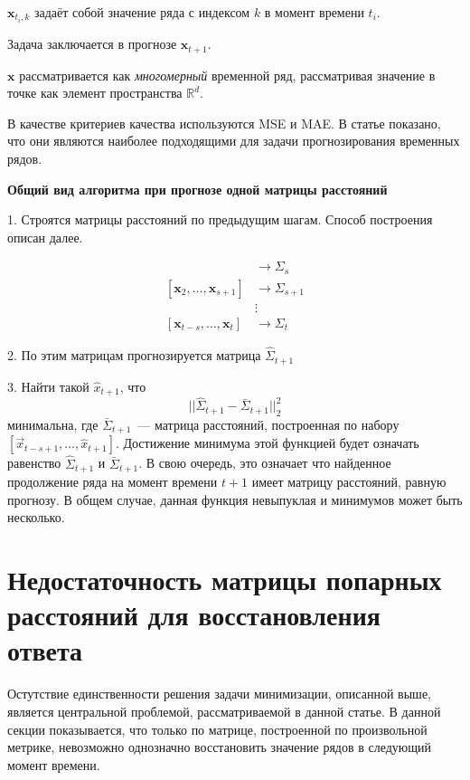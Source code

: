 \documentclass{article}
\begin{document}
$\mathbf{x}_{t_i, k}$ задаёт собой значение ряда с индексом $k$ в момент времени $t_i$.

Задача заключается в прогнозе $\mathbf{x}_{t+1}$.

$\mathbf{x}$ рассматривается как \textit{многомерный} временной ряд, рассматривая значение в точке как элемент пространства $\mathbb{R}^d$.

В качестве критериев качества используются MSE и MAE. В статье \cite{jadon2022comprehensive} показано, что они являются наиболее подходящими для задачи прогнозирования временных рядов.

\textbf{Общий вид алгоритма при прогнозе одной матрицы расстояний}

1. Строятся матрицы расстояний по предыдущим шагам. Способ построения описан далее.

\begin{align*}
	[\mathbf{x}_1, \ldots, \mathbf{x}_s] &\rightarrow \Sigma_s \\
	[\mathbf{x}_2, \ldots, \mathbf{x}_{s+1}] &\rightarrow \Sigma_{s+1} \\
	&\vdots \\
	[\mathbf{x}_{t-s}, \ldots, \mathbf{x}_t] &\rightarrow \Sigma_{t}
\end{align*}

2. По этим матрицам прогнозируется матрица $\hat{\Sigma}_{t+1}$

3. Найти такой $\hat{x}_{t+1}$, что \[ ||\hat{\Sigma}_{t+1} - \bar{\Sigma}_{t+1}||_2^2 \] минимальна, где $\bar{\Sigma}_{t+1}$~--- матрица расстояний, построенная по набору $[\vec{x}_{t-s+1}, \ldots, \hat{x}_{t+1}]$. Достижение минимума этой функцией будет означать равенство $\hat{\Sigma}_{t+1}$ и $\bar{\Sigma}_{t+1}$. В свою очередь, это означает что найденное продолжение ряда на момент времени $t+1$ имеет матрицу расстояний, равную прогнозу. В общем случае, данная функция невыпуклая и минимумов может быть несколько.

\section{Недостаточность матрицы попарных расстояний для восстановления ответа}

Остутствие единственности решения задачи минимизации, описанной выше, является центральной проблемой, рассматриваемой в данной статье. В данной секции показывается, что только по матрице, построенной по произвольной метрике, невозможно однозначно восстановить значение рядов в следующий момент времени.
\end{document}
